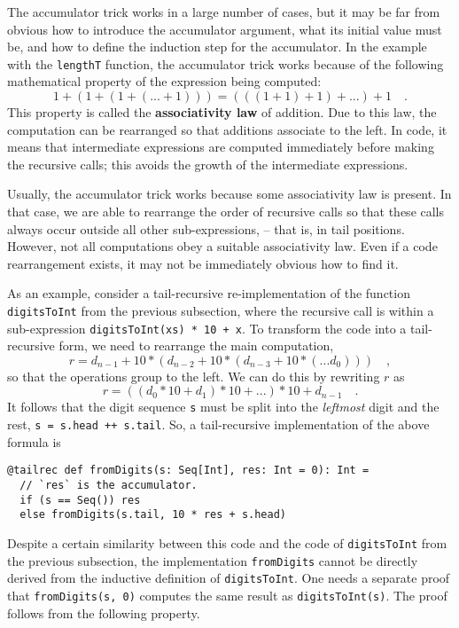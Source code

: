The accumulator trick works in a large number of cases, but it may
be far from obvious how to introduce the accumulator argument, what
its initial value must be, and how to define the induction step for
the accumulator. In the example with the \lstinline!lengthT!
function, the accumulator trick works because of the following mathematical
property of the expression being computed:
\[
1+\left(1+\left(1+\left(...+1\right)\right)\right)=\left(\left(\left(1+1\right)+1\right)+...\right)+1\quad.
\]
This property is called the \textbf{associativity
law} of addition. Due to this law, the computation can be rearranged
so that additions associate to the left. In code, it means that intermediate
expressions are computed immediately before making the recursive calls;
this avoids the growth of the intermediate expressions. 

Usually, the accumulator trick works because some associativity law
is present. In that case, we are able to rearrange the order of recursive
calls so that these calls always occur outside all other sub-expressions,
– that is, in tail positions. However, not all computations obey a
suitable associativity law. Even if a code rearrangement exists, it
may not be immediately obvious how to find it.

As an example, consider a tail-recursive re-implementation of the
function \lstinline!digitsToInt!
from the previous subsection, where the recursive call is within a
sub-expression \lstinline!digitsToInt(xs) * 10 + x!.
To transform the code into a tail-recursive form, we need to rearrange
the main computation,
\[
r=d_{n-1}+10*\left(d_{n-2}+10*\left(d_{n-3}+10*\left(...d_{0}\right)\right)\right)\quad,
\]
so that the operations group to the left. We can do this by rewriting
$r$ as
\[
r=\left(\left(d_{0}*10+d_{1}\right)*10+...\right)*10+d_{n-1}\quad.
\]
It follows that the digit sequence \lstinline!s!
must be split into the \emph{leftmost} digit and the rest, \lstinline!s = s.head ++ s.tail!.
So, a tail-recursive implementation of the above formula is
\begin{lstlisting}
@tailrec def fromDigits(s: Seq[Int], res: Int = 0): Int =
  // `res` is the accumulator.
  if (s == Seq()) res
  else fromDigits(s.tail, 10 * res + s.head)
\end{lstlisting}
Despite a certain similarity between this code and the code of \lstinline!digitsToInt!
from the previous subsection, the implementation \lstinline!fromDigits!
cannot be directly derived from the inductive definition of \lstinline!digitsToInt!.
One needs a separate proof that \lstinline!fromDigits(s, 0)!
computes the same result as \lstinline!digitsToInt(s)!.
The proof follows from the following property.

